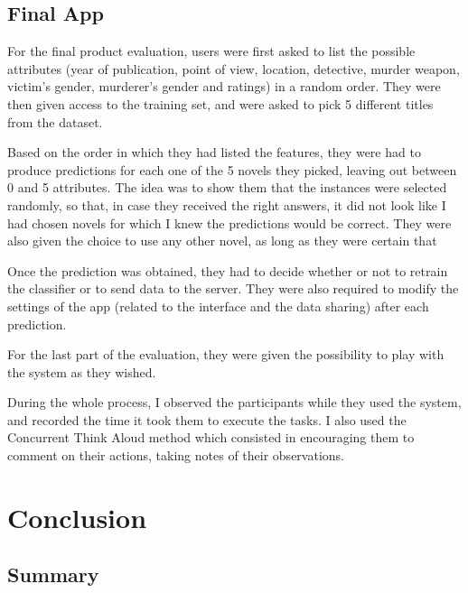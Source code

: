 \documentclass{mproj}
\begin{document}
\section{Final App}

For the final product evaluation, users were first asked to list the possible attributes (year of publication, point of view, location, detective, murder weapon, victim's gender, murderer's gender and ratings) in a random order. They were then given access to the training set, and were asked to pick 5 different titles from the dataset. \par

Based on the order in which they had listed the features, they were had to produce predictions for each one of the 5 novels they picked, leaving out between 0 and 5 attributes. The idea was to show them that the instances were selected randomly, so that, in case they received the right answers, it did not look like I had chosen novels for which I knew the predictions would be correct. They were also given the choice to use any other novel, as long as they were certain that \par 

Once the prediction was obtained, they had to decide whether or not to retrain the classifier or to send data to the server. They were also required to modify the settings of the app (related to the interface and the data sharing) after each prediction. \par

For the last part of the evaluation, they were given the possibility to play with the system as they wished.\par

During the whole process, I observed the participants while they used the system, and recorded the time it took them to execute the tasks. I also used the Concurrent Think Aloud method \cite{usabilitytest} which consisted in encouraging them to comment on their actions, taking notes of their observations.


\chapter{Conclusion}\label{conclusion}

\section{Summary}
\end{document}
